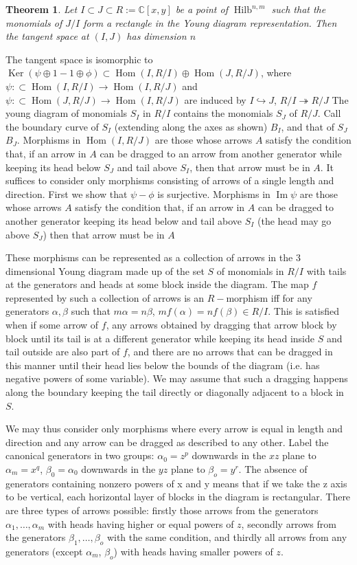 \documentclass[a4paper,12pt,titlepage]{article}
\newcommand{\C}{\mathbb{C}}
\DeclareMathOperator{\Ker}{Ker}
\DeclareMathOperator{\im}{Im}
\DeclareMathOperator{\Hom}{Hom}
\DeclareMathOperator{\Hilb}{Hilb}
\newtheorem{thm}{Theorem}
\begin{document}
\begin{thm} Let $I \subset J \subset R := \C[x,y]$ be a point of $\Hilb^{n,m}$ such that the monomials of $J/I$ form a rectangle in the Young diagram representation. Then the tangent space at $(I,J)$ has dimension $n$
\end{thm}
The tangent space is isomorphic to $\Ker (\psi \oplus 1 - 1 \oplus \phi) \subset \Hom(I,R/I)\oplus \Hom(J,R/J)$, where $\psi : \subset \Hom(I,R/I) \to \Hom(I,R/J)$ and $\psi : \subset \Hom(J,R/J) \to \Hom(I,R/J)$
are induced by $I \hookrightarrow J$, $R/I \twoheadrightarrow R/J$
The young diagram of monomials $S_I$ in $R/I$ contains the monomials $S_J$ of $R/J$. Call the boundary curve of $S_I$ (extending along the axes as shown) $B_I$, and that of $S_J$ $B_J$. 
Morphisms in $\Hom(I,R/J)$ are those whose arrows $A$ satisfy the condition that, if an arrow in $A$ can be dragged to an arrow from another generator while keeping its head below $S_J$ and tail above $S_I$,
then that arrow must be in $A$.
It suffices to consider only morphisms consisting of arrows of a single length and direction.
First we show that $\psi-\phi$ is surjective. Morphisms in $\im \psi$ are those whose arrows $A$ satisfy the condition that,
if an arrow in $A$ can be dragged to another generator keeping its head below and tail above $S_I$ (the head may go above $S_J$) then that arrow must be in $A$




These morphisms can be represented as a collection of arrows in the 3 dimensional Young diagram made up of the set $S$ of monomials in $R/I$
with tails at the generators and heads at some block inside the diagram.
The map $f$ represented by such a collection of arrows is an $R-$morphism iff for any generators $\alpha,\beta$ such that $m\alpha=n\beta$, $mf(\alpha)=nf(\beta) \in R/I$.
This is satisfied when if some arrow of $f$, any arrows obtained by dragging that arrow block by block until its tail is at a different generator
while keeping its head inside $S$ and tail outside are also part of $f$, and there are no arrows that
can be dragged in this manner until their head lies below the bounds of the diagram (i.e. has negative powers of some variable).
We may assume that such a dragging happens along the boundary keeping the tail directly or diagonally adjacent to a block in $S$.

We may thus consider only morphisms where every arrow is equal in length and direction and any arrow can be dragged as described to any other.
Label the canonical generators in two groups: $\alpha_0=z^p$ downwards in the $xz$ plane to $\alpha_m=x^q$, $\beta_0=\alpha_0$ downwards in the $yz$ plane to $\beta_o=y^r$. 
The absence of generators containing nonzero powers of x and y means that if we take the z axis to be vertical, each horizontal layer of blocks in the diagram is rectangular.
There are three types of arrows possible: firstly those arrows from the generators $\alpha_1, \dots, \alpha_m$ with heads having higher or equal powers of $z$,
secondly arrows from the generators $\beta_1, \dots, \beta_o$ with the same condition,
and thirdly all arrows from any generators (except $\alpha_m$, $\beta_o$) with heads having smaller powers of $z$.
\end{document}
